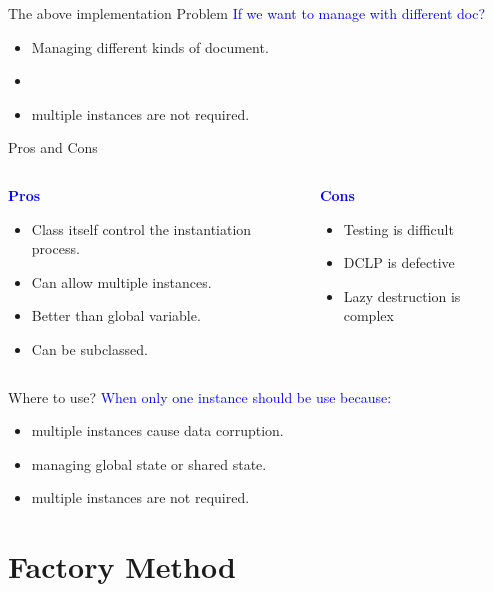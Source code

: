\documentclass[13pt]{beamer}
\begin{document}
\begin{frame}{The above implementation Problem}
	\textcolor{blue}{If we want to manage with different doc?}	
	\begin{itemize}
		\setlength\itemsep{1em}
		\item Managing different kinds of document.
		\item 
		\item multiple instances are not required.
	\end{itemize}
\end{frame}

\begin{frame}{Pros and Cons}
\begin{columns}[T]
\begin{column}{.45\textwidth}
	\begin{center}
	\textcolor{blue}{\textbf{Pros}}
	\end{center}
	\begin{itemize}
		\setlength\itemsep{1em}
		\item Class itself control the instantiation process.
		\item Can allow multiple instances.
		\item Better than global variable.
		\item Can be subclassed.
	\end{itemize}
\end{column}
\begin{column}{.45\textwidth}
	\begin{center}
	\textcolor{blue}{\textbf{Cons}}
	\end{center}
		\begin{itemize}
		\setlength\itemsep{1em}
		\item Testing is difficult
		\item DCLP is defective
		\item Lazy destruction is complex
	\end{itemize}
\end{column}
\end{columns}
\end{frame}

\begin{frame}{Where to use?}
	\textcolor{blue}{When only one instance should be use because:}	
	\begin{itemize}
		\setlength\itemsep{1em}
		\item multiple instances cause data corruption.
		\item managing global state or shared state.
		\item multiple instances are not required.
	\end{itemize}
\end{frame}
\section{Factory Method}
\end{document}
